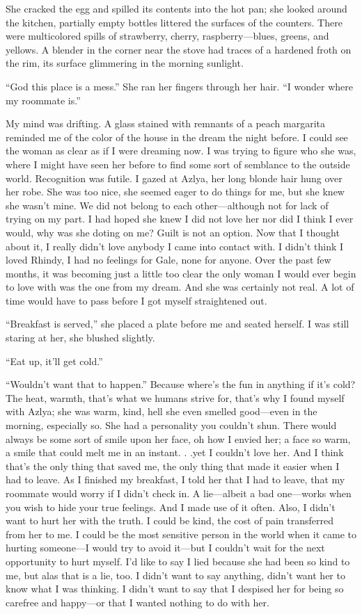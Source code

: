 She cracked the egg and spilled its contents into the hot pan; she
looked around the kitchen, partially empty bottles littered the surfaces
of the counters. There were multicolored spills of strawberry, cherry,
raspberry---blues, greens, and yellows. A blender in the corner near the
stove had traces of a hardened froth on the rim, its surface glimmering
in the morning sunlight.

``God this place is a mess.'' She ran her fingers through her hair. ``I
wonder where my roommate is.''

My mind was drifting. A glass stained with remnants of a peach margarita
reminded me of the color of the house in the dream the night before. I
could see the woman as clear as if I were dreaming now. I was trying to
figure who she was, where I might have seen her before to find some sort
of semblance to the outside world. Recognition was futile. I gazed at
Azlya, her long blonde hair hung over her robe. She was too nice, she
seemed eager to do things for me, but she knew she wasn't mine. We did
not belong to each other---although not for lack of trying on my part. I
had hoped she knew I did not love her nor did I think I ever would, why
was she doting on me? Guilt is not an option. Now that I thought about
it, I really didn't love anybody I came into contact with. I didn't
think I loved Rhindy, I had no feelings for Gale, none for anyone. Over
the past few months, it was becoming just a little too clear the only
woman I would ever begin to love with was the one from my dream. And she
was certainly not real. A lot of time would have to pass before I got
myself straightened out.

``Breakfast is served,'' she placed a plate before me and seated
herself. I was still staring at her, she blushed slightly.

``Eat up, it'll get cold.''

``Wouldn't want that to happen.'' Because where's the fun in anything if
it's cold? The heat, warmth, that's what we humans strive for, that's
why I found myself with Azlya; she was warm, kind, hell she even smelled
good---even in the morning, especially so. She had a personality you
couldn't shun. There would always be some sort of smile upon her face,
oh how I envied her; a face so warm, a smile that could melt me in an
instant. . .yet I couldn't love her. And I think that's the only thing
that saved me, the only thing that made it easier when I had to leave.
As I finished my breakfast, I told her that I had to leave, that my
roommate would worry if I didn't check in. A lie---albeit a bad
one---works when you wish to hide your true feelings. And I made use of
it often. Also, I didn't want to hurt her with the truth. I could be
kind, the cost of pain transferred from her to me. I could be the most
sensitive person in the world when it came to hurting someone---I would
try to avoid it---but I couldn't wait for the next opportunity to hurt
myself. I'd like to say I lied because she had been so kind to me, but
alas that is a lie, too. I didn't want to say anything, didn't want her
to know what I was thinking. I didn't want to say that I despised her
for being so carefree and happy---or that I wanted nothing to do with
her.

